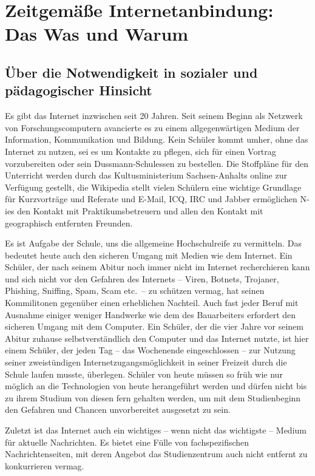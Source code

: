 \documentclass[10pt,a4paper,notitlepage]{scrartcl}
\begin{document}
\setlength{\columnsep}{1cm}
\section{Zeitgemäße Internetanbindung: Das Was und Warum}
\subsection{Über die Notwendigkeit in sozialer und pädagogischer Hinsicht}
\begin{multicols}{2}
Es gibt das Internet inzwischen seit 20 Jahren. Seit seinem Beginn als Netzwerk von Forschungscomputern avancierte es zu einem allgegenwärtigen Medium der Information, Kommunikation und Bildung. Kein Schüler kommt umher, ohne das Internet zu nutzen, sei es um Kontakte zu pflegen, sich für einen Vortrag vorzubereiten oder sein Dussmann-Schulessen zu bestellen. Die Stoffpläne für den Unterricht werden durch das Kultusministerium Sachsen-Anhalts online zur Verfügung gestellt, die Wikipedia stellt vielen Schülern eine wichtige Grundlage für Kurzvorträge und Referate und E-Mail, ICQ, IRC und Jabber ermöglichen N-ies den Kontakt mit Praktikumsbetreuern und allen den Kontakt mit geographisch entfernten Freunden.

Es ist Aufgabe der Schule, uns die allgemeine Hochschulreife zu vermitteln. Das bedeutet heute auch den sicheren Umgang mit Medien wie dem Internet. Ein Schüler, der nach seinem Abitur noch immer nicht im Internet recherchieren kann und sich nicht vor den Gefahren des Internets -- Viren, Botnets, Trojaner, Phishing, Sniffing, Spam, Scam etc.\ -- zu schützen vermag, hat seinen Kommilitonen gegenüber einen erheblichen Nachteil. Auch fast jeder Beruf mit Ausnahme einiger weniger Handwerke wie dem des Bauarbeiters erfordert den sicheren Umgang mit dem Computer. Ein Schüler, der die vier Jahre vor seinem Abitur zuhause selbstverständlich den Computer und das Internet nutzte, ist hier einem Schüler, der jeden Tag -- das Wochenende eingeschlossen -- zur Nutzung seiner zweistündigen Internetzugangsmöglichkeit in seiner Freizeit durch die Schule laufen musste,  überlegen. Schüler von heute müssen so früh wie nur möglich an die Technologien von heute herangeführt werden und dürfen nicht bis zu ihrem Studium von diesen fern gehalten werden, um mit dem Studienbeginn den Gefahren und Chancen unvorbereitet ausgesetzt zu sein.

Zuletzt ist das Internet auch ein wichtiges -- wenn nicht das wichtigste -- Medium für aktuelle Nachrichten. Es bietet eine Fülle von fachspezifischen Nachrichtenseiten, mit deren Angebot das Studienzentrum auch nicht entfernt zu konkurrieren vermag.
\end{multicols}
\end{document}
